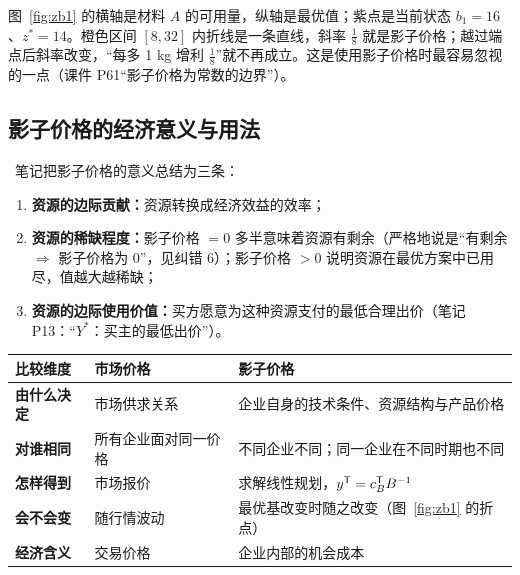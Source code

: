 图~\ref{fig:zb1} 的横轴是材料 $A$ 的可用量，纵轴是最优值；紫点是当前状态 $b_1=16$、$z^*=14$。橙色区间 $[8,32]$ 内折线是一条直线，斜率 $\frac18$ 就是影子价格；越过端点后斜率改变，“每多 1 kg 增利 $\frac18$”就不再成立。这是使用影子价格时最容易忽视的一点（课件 P61“影子价格为常数的边界”）。

\subsection{影子价格的经济意义与用法}

\ 笔记把影子价格的意义总结为三条：
\begin{enumerate}
  \item \textbf{资源的边际贡献：}资源转换成经济效益的效率；
  \item \textbf{资源的稀缺程度：}影子价格 $=0$ 多半意味着资源有剩余（严格地说是“有剩余 $\Rightarrow$ 影子价格为 0”，见纠错 6）；影子价格 $>0$ 说明资源在最优方案中已用尽，值越大越稀缺；
  \item \textbf{资源的边际使用价值：}买方愿意为这种资源支付的最低合理出价（笔记 P13：“$Y^*$：买主的最低出价”）。
\end{enumerate}

\begin{table}[!htbp]\centering
\small
\begin{tabularx}{\linewidth}{@{}>{\bfseries}lXX@{}}
\toprule
\rowcolor{lightblue}比较维度 & 市场价格 & 影子价格\\\midrule
由什么决定 & 市场供求关系 & 企业自身的技术条件、资源结构与产品价格\\
对谁相同 & 所有企业面对同一价格 & 不同企业不同；同一企业在不同时期也不同\\
怎样得到 & 市场报价 & 求解线性规划，$y^{\mathsf T}=c_B^{\mathsf T} B^{-1}$\\
会不会变 & 随行情波动 & 最优基改变时随之改变（图~\ref{fig:zb1} 的折点）\\
经济含义 & 交易价格 & 企业内部的机会成本\\\bottomrule
\end{tabularx}\par\nopagebreak[4]
\end{table}


